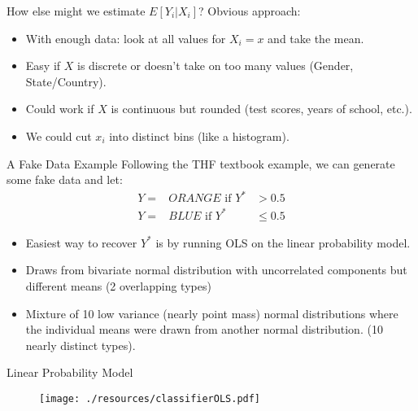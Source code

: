 \documentclass[11pt,handout,xcolor=pdftex,dvipsnames,table,mathserif,aspectratio=169]{beamer}
\begin{document}
\begin{frame}{How else might we estimate $E[Y_i | X_i]$?}
Obvious approach:
\begin{itemize}
\item With enough data: look at all values for $X_i = x$ and take the mean.
\item Easy if $X$ is discrete or doesn't take on too many values (Gender, State/Country).
\item Could work if $X$ is continuous but rounded (test scores, years of school, etc.).
\item We could cut $x_i$ into distinct bins (like a histogram).
\end{itemize}
\end{frame}


\begin{frame}{A Fake Data Example}
Following the THF textbook example, we can generate some fake data and let: 
\begin{eqnarray*}
Y=&ORANGE \mbox{ if } Y^{*} &> 0.5 \\
Y=&BLUE  \mbox{ if }   Y^{*} &\leq 0.5
\end{eqnarray*}
\begin{itemize}
\item Easiest way to recover $Y^{*}$ is by running OLS on the linear probability model.
\item Draws from bivariate normal distribution with uncorrelated components but different means (2 overlapping types)
\item Mixture of 10 low variance (nearly point mass) normal distributions where the individual means were drawn from another normal distribution. (10 nearly distinct types).
\end{itemize}
\end{frame}

\begin{frame}{Linear Probability Model}
\begin{figure}[htbp]
\begin{center}
\texttt{[image: ./resources/classifierOLS.pdf]}
\label{classOLS}
\end{center}
\end{figure}
\end{frame}
\end{document}

